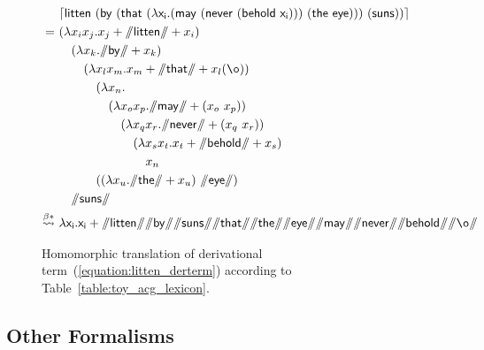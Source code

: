 \begin{figure}
	{\smaller
	\begin{align*}
	& 			\hm{\term{litten~(by~(that~(\lambda x_i .(may~(never~(behold~x_i )))~(the~eye)))~(suns))}} \\
	= \ 
	&							(\lambda x_ix_j.x_j + \str{litten}+ x_i) \\
	&\quad								(\lambda x_k.\str{by}+ x_k)\\
	&\qquad									(\lambda x_lx_m. x_m + \str{that} + x_l(\o))\\
	&\qqquad								(\lambda x_n. \\
	&\qqquad\quad										(\lambda x_o x_p.\str{may}+(x_o ~x_p))\\
	&\qqquad\qquad											(\lambda x_q x_r.\str{never}+(x_q~x_r))\\
	&\qqquad\qqquad												(\lambda x_sx_t.x_t+\str{behold}+x_s)\\
	&\qqquad\qqqquad												x_n \\
	&\qqquad												((\lambda x_u.\str{the}+x_u)~\str{eye})\\
	&\quad									\str{suns}\\
	\bredstar \ & \term{\lambda x_i.x_i + \str{litten}\str{by}\str{suns}\str{that}\str{the}\str{eye}\str{may}\str{never}\str{behold}}\str{\o}
	\end{align*}
	}
	\caption{Homomorphic translation of derivational term~(\ref{equation:litten_derterm}) according to Table~\ref{table:toy_acg_lexicon}.}
	\label{figure:acg_derivation}
\end{figure}

\subsection{Other Formalisms}

\nocite{sorensen2006lectures}
\nocite{martin1982constructive}



